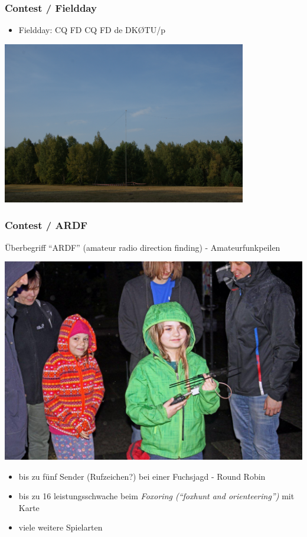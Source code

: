 \begin{frame}
    \frametitle{Contest / Fieldday}

    \begin{itemize}
        \item Fieldday: CQ FD CQ FD de DKØTU/p
    \end{itemize}

    \begin{center}
        \includegraphics[width=0.8\textwidth,height=.7\textheight,keepaspectratio]{bv10/2014-09-06_160906.jpg}
        \tiny \hyperlink{refs}{\cite{blog}}
    \end{center}

\end{frame}

\begin{frame}
    \frametitle{Contest / ARDF}

    Überbegriff ``ARDF'' (amateur radio direction finding) - Amateurfunkpeilen

    \begin{center}
        \includegraphics[width=.6\textwidth,height=.5\textheight,keepaspectratio]{bv10/IMG_1910.jpg}
        \tiny \hyperlink{refs}{\cite{blog}}
    \end{center}

    \begin{itemize}
        \item bis zu fünf Sender (Rufzeichen?) bei einer Fuchsjagd - Round Robin
        \item bis zu 16 leistungsschwache beim \emph{Foxoring (``foxhunt and
              orienteering'')} mit Karte
        \item viele weitere Spielarten
    \end{itemize}

\end{frame}

